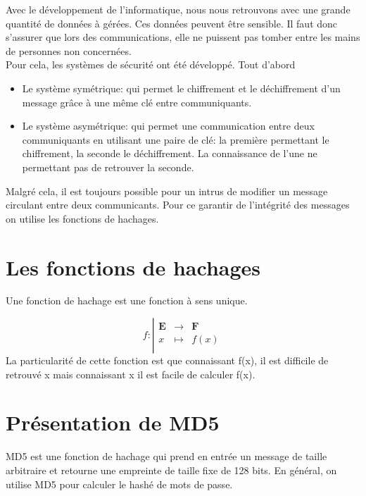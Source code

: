 \documentclass[a4paper,11pt,french]{article}
\begin{document}
Avec le développement de l'informatique, nous nous retrouvons avec une grande quantité de données à gérées. Ces données peuvent \^etre sensible. Il faut donc s'assurer que lors des communications, elle ne puissent pas tomber entre les mains de personnes non concernées.\\

Pour cela, les systèmes de sécurité ont été développé. Tout d'abord \begin{itemize}
\item Le système symétrique: qui permet le chiffrement et le déchiffrement d'un message gr\^ace à une m\^eme clé  entre communiquants.
\item Le système asymétrique: qui permet une communication entre deux communiquants en utilisant une paire de clé: la première permettant le chiffrement, la seconde le déchiffrement. La connaissance de l'une ne permettant pas de retrouver la seconde.
\end{itemize}
\vspace{.5cm}
Malgré cela, il est toujours possible pour un intrus de modifier un message circulant entre deux communicants. Pour ce garantir de l'intégrité des messages on utilise les fonctions de hachages.
 

\section{Les fonctions de hachages}
Une fonction de hachage est une fonction à sens unique.

\begin{displaymath}
f:
\left|
  \begin{array}{rcl}
    \mathbf{E} & \longrightarrow &\mathbf{F} \\
    x & \longmapsto & f(x) \\
  \end{array}
\right.
\end{displaymath}
La particularité de cette fonction est que connaissant f(x), il est difficile de retrouvé x mais connaissant x il est facile de calculer f(x).



\section{Présentation de MD5}

MD5 est une fonction de hachage qui prend en entrée un message de taille arbitraire et retourne une empreinte de taille fixe de 128 bits. En général, on utilise MD5 pour calculer le hashé de mots de passe.\\
\end{document}
